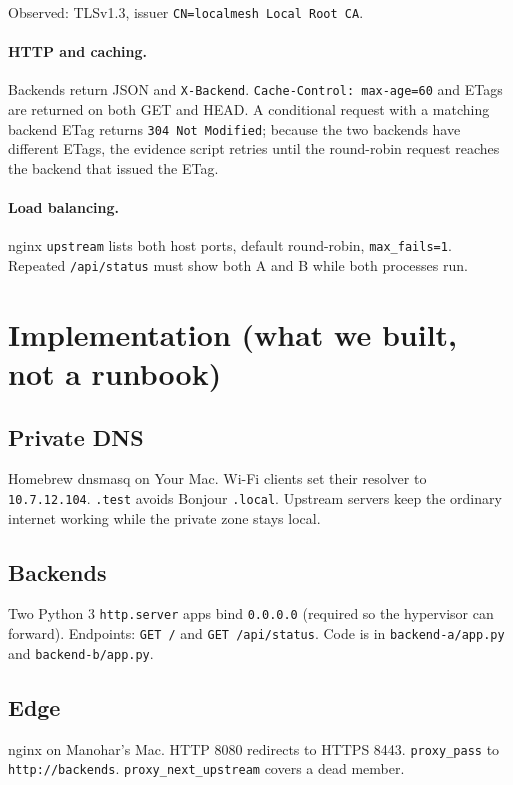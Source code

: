 \documentclass[11pt,a4paper]{article}
\begin{document}
Observed: TLSv1.3, issuer \texttt{CN=localmesh Local Root CA}.

\paragraph{HTTP and caching.}
Backends return JSON and \texttt{X-Backend}. \texttt{Cache-Control: max-age=60} and
ETags are returned on both GET and HEAD. A conditional request with a matching
backend ETag returns \texttt{304 Not Modified}; because the two backends have
different ETags, the evidence script retries until the round-robin request reaches
the backend that issued the ETag.

\paragraph{Load balancing.}
nginx \texttt{upstream} lists both host ports, default round-robin, \texttt{max\_fails=1}.
Repeated \texttt{/api/status} must show both A and B while both processes run.

\section{Implementation (what we built, not a runbook)}

\subsection{Private DNS}
Homebrew dnsmasq on Your Mac. Wi-Fi clients set their resolver to \texttt{10.7.12.104}.
\texttt{.test} avoids Bonjour \texttt{.local}. Upstream servers keep the ordinary internet working
while the private zone stays local.

\subsection{Backends}
Two Python 3 \texttt{http.server} apps bind \texttt{0.0.0.0} (required so the hypervisor can
forward). Endpoints: \texttt{GET /} and \texttt{GET /api/status}. Code is in
\texttt{backend-a/app.py} and \texttt{backend-b/app.py}.

\subsection{Edge}
nginx on Manohar's Mac. HTTP 8080 redirects to HTTPS 8443. \texttt{proxy\_pass} to
\texttt{http://backends}. \texttt{proxy\_next\_upstream} covers a dead member.
\end{document}
